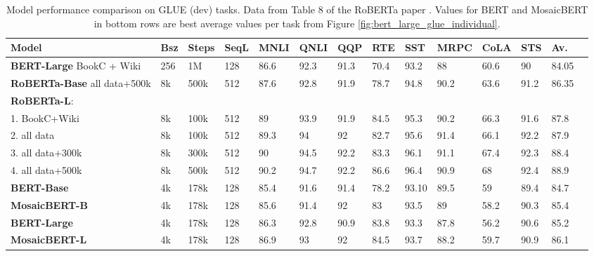 \begin{table}[h!]
\centering
\footnotesize
\begin{tabular}{p{2.2cm} p{0.5cm} p{0.5cm} p{0.6cm} p{0.6cm} p{0.6cm} p{0.6cm} p{0.6cm} p{0.6cm} p{0.6cm} p{0.6cm} p{0.6cm} p{0.6cm} p{0.6cm}}

\toprule
\textbf{Model} & \textbf{Bsz} & \textbf{Steps} &\textbf{SeqL} & \textbf{MNLI} & \textbf{QNLI} & \textbf{QQP} & \textbf{RTE} & \textbf{SST} & \textbf{MRPC} & \textbf{CoLA} & \textbf{STS} & \textbf{Av.} \\
\midrule
\textbf{BERT-Large} BookC + Wiki & 256 & 1M & 128 & 86.6 & 92.3 & 91.3 & 70.4 & 93.2 & 88 & 60.6 & 90 & 84.05 \\ 
\textbf{RoBERTa-Base} all data+500k & 8k & 500k & 512 & 87.6 & 92.8 & 91.9 & 78.7 & 94.8 & 90.2 & 63.6 & 91.2 & 86.35 \\ 
\textbf{RoBERTa-L}: & & & & & & & & & & & & \\ 
1. BookC+Wiki & 8k & 100k & 512 & 89 & 93.9 & 91.9 & 84.5 & 95.3 & 90.2 & 66.3 & 91.6 & 87.8 \\ 
2. all data & 8k & 100k & 512 & 89.3 & 94 & 92 & 82.7 & 95.6 & 91.4 & 66.1 & 92.2 & 87.9 \\ 
3. all data+300k & 8k & 300k & 512 & 90 & 94.5 & 92.2 & 83.3 & 96.1 & 91.1 & 67.4 & 92.3 & 88.4 \\ 
4. all data+500k & 8k & 500k & 512 & 90.2 & 94.7 & 92.2 & 86.6 & 96.4 & 90.9 & 68 & 92.4 & 88.9 \\ 
\midrule
\textbf{BERT-Base} & 4k & 178k & 128 & 85.4 & 91.6 & 91.4 & 78.2 &  93.10 & 89.5 & 59 & 89.4 &    84.7 \\
 \textbf{MosaicBERT-B} & 4k & 178k & 128 & 85.6 & 91.4 & 92 & 83 &  93.5 & 89 & 58.2 & 90.3 &    85.4 \\
\textbf{BERT-Large} & 4k & 178k & 128 & 86.3 & 92.8 & 90.9 & 83.8 &  93.3 & 87.8 & 56.2 & 90.6 &    85.2 \\
\textbf{MosaicBERT-L} & 4k & 178k & 128 & 86.9 & 93 & 92 & 84.5 &  93.7 & 88.2 & 59.7 & 90.9 &    86.1 \\
\bottomrule
\end{tabular}
\label{roberta_table}
\caption{Model performance comparison on GLUE (dev) tasks. Data from Table 8 of the RoBERTa paper \citep{liu2019roberta}. Values for BERT and MosaicBERT in bottom rows are best average values per task from Figure \ref{fig:bert_large_glue_individual}.}
\label{tab:roberta}
\end{table}



